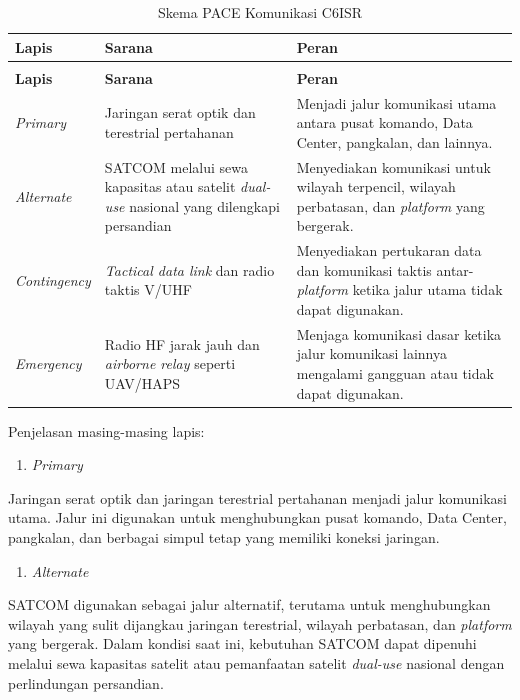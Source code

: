 \begin{longtable}{@{}>{\raggedright\arraybackslash}p{}>{\raggedright\arraybackslash}p{}>{\raggedright\arraybackslash}p{}@{}}
\caption{Skema PACE Komunikasi C6ISR}
\label{tab:d4-31}\\
\toprule
\textbf{Lapis} & \textbf{Sarana} & \textbf{Peran}\\
\midrule
\endfirsthead
\multicolumn{3}{@{}l}{\small\itshape \tablename\ \thetable{} (lanjutan)}\\
\toprule
\textbf{Lapis} & \textbf{Sarana} & \textbf{Peran}\\
\midrule
\endhead
\bottomrule
\endlastfoot
\textit{Primary} & Jaringan serat optik dan terestrial pertahanan & Menjadi jalur komunikasi utama antara pusat komando, Data Center, pangkalan, dan lainnya.\\
\textit{Alternate} & SATCOM melalui sewa kapasitas atau satelit \textit{dual-use} nasional yang dilengkapi persandian & Menyediakan komunikasi untuk wilayah terpencil, wilayah perbatasan, dan \textit{platform} yang bergerak.\\
\textit{Contingency} & \textit{Tactical data link} dan radio taktis V/UHF & Menyediakan pertukaran data dan komunikasi taktis antar-\textit{platform} ketika jalur utama tidak dapat digunakan.\\
\textit{Emergency} & Radio HF jarak jauh dan \textit{airborne relay} seperti UAV/HAPS & Menjaga komunikasi dasar ketika jalur komunikasi lainnya mengalami gangguan atau tidak dapat digunakan.\\
\end{longtable}

Penjelasan masing-masing lapis:

\begin{enumerate}
  \item \textit{Primary}
\end{enumerate}
Jaringan serat optik dan jaringan terestrial pertahanan menjadi jalur komunikasi utama. Jalur ini digunakan untuk menghubungkan pusat komando, Data Center, pangkalan, dan berbagai simpul tetap yang memiliki koneksi jaringan.

\begin{enumerate}[start=2]
  \item \textit{Alternate}
\end{enumerate}
SATCOM digunakan sebagai jalur alternatif, terutama untuk menghubungkan wilayah yang sulit dijangkau jaringan terestrial, wilayah perbatasan, dan \textit{platform} yang bergerak. Dalam kondisi saat ini, kebutuhan SATCOM dapat dipenuhi melalui sewa kapasitas satelit atau pemanfaatan satelit \textit{dual-use} nasional dengan perlindungan persandian.

